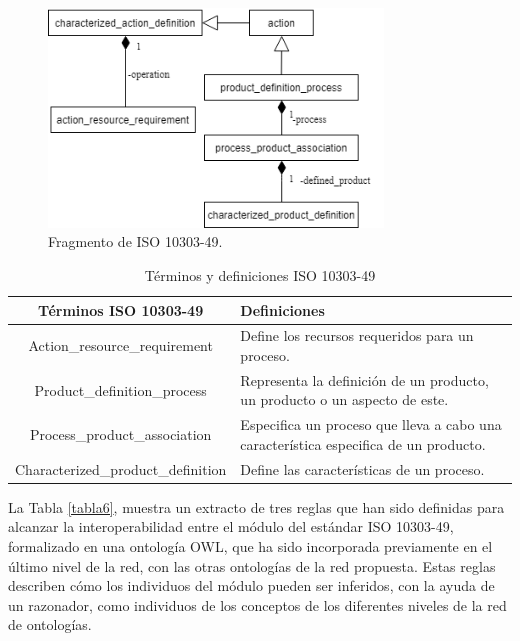 \documentclass[journal]{IEEEtran}
\begin{document}
\begin{figure}[!t]
\centering
\includegraphics[width=3.5in]{figures/figure9.png}
\caption{Fragmento de ISO 10303-49.}
\label{fig9}
\end{figure}

\begin{table}[!t]
\renewcommand{\arraystretch}{1.3}
\caption{T\'erminos y definiciones ISO 10303-49}
\label{tabla5}
\centering
\begin{tabular}{cp{4cm}}
\hline
\hline
 T\'erminos ISO 10303-49 &  Definiciones \\
\hline
Action\_resource\_requirement & Define los recursos requeridos para un proceso. \\ \cline{1-2}
Product\_definition\_process & Representa la definici\'on de un producto, un producto o un aspecto de este. \\ \cline{1-2}
Process\_product\_association & Especifica un proceso que lleva a cabo una caracter\'istica especifica de un producto. \\  \cline{1-2}
Characterized\_product\_definition & Define las caracter\'isticas de un proceso. \\
\hline \hline
\end{tabular}
\end{table}

La Tabla \ref{tabla6}, muestra un extracto de tres reglas que han sido definidas para alcanzar la interoperabilidad entre el m\'odulo del est\'andar ISO 10303-49, formalizado en una ontolog\'ia OWL, que ha sido incorporada previamente en el \'ultimo nivel de la red, con las otras ontolog\'ias de la red propuesta. Estas reglas describen c\'omo los individuos del m\'odulo pueden ser inferidos, con la ayuda de un razonador, como individuos de los conceptos de los diferentes niveles de la red de ontolog\'ias.
\end{document}
